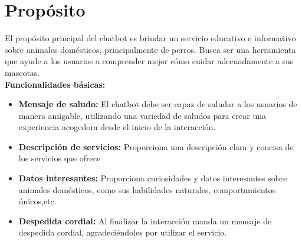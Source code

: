 \documentclass[a4paper,12pt]{article}
\begin{document}


\newpage
\section{Propósito}

El propósito principal del chatbot es brindar un servicio educativo e informativo sobre animales domésticos, principalmente de perros. Busca ser una herramienta que ayude a los usuarios a comprender mejor cómo cuidar adecuadamente a sus mascotas.\\

\textbf{Funcionalidades básicas:}
\begin{itemize}
    \item \textbf{Mensaje de saludo:} El chatbot debe ser capaz de saludar a los usuarios de manera amigable, utilizando una variedad de saludos para crear una experiencia acogedora desde el inicio de la interacción.
    
    \item \textbf{Descripción de servicios:} Proporciona una descripción clara y concisa de los servicios que ofrece 

    \item \textbf{Datos interesantes:} Proporciona curiosidades y datos interesantes sobre animales domésticos, como sus habilidades naturales, comportamientos únicos,etc.

    \item \textbf{Despedida cordial:} Al finalizar la interacción manda un mensaje de despedida cordial, agradeciéndoles por utilizar el servicio.
\end{itemize}



\end{document}
